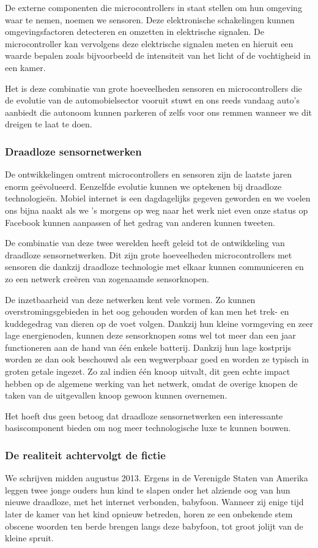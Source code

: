 \documentclass[DIV=calc,paper=a4,fontsize=11pt,twocolumn]{scrartcl}
\newcommand{\heading}[1]{
\vspace{-5mm}
\subsubsection*{#1}
\vspace{-2mm}
}
\begin{document}
De externe componenten die microcontrollers in staat stellen om hun omgeving
waar te nemen, noemen we sensoren. Deze elektronische schakelingen kunnen
omgevingsfactoren detecteren en omzetten in elektrische signalen. De
microcontroller kan vervolgens deze elektrische signalen meten en hieruit een
waarde bepalen zoals bijvoorbeeld de intensiteit van het licht of de
vochtigheid in een kamer.

Het is deze combinatie van grote hoeveelheden sensoren en microcontrollers die
de evolutie van de automobielsector vooruit stuwt en ons reeds vandaag auto's
aanbiedt die autonoom kunnen parkeren of zelfs voor ons remmen wanneer we dit
dreigen te laat te doen.

\heading{Draadloze sensornetwerken}

De ontwikkelingen omtrent microcontrollers en sensoren zijn de laatste jaren
enorm ge\"evolueerd. Eenzelfde evolutie kunnen we optekenen bij draadloze
technologie\"en. Mobiel internet is een dagdagelijks gegeven geworden en we
voelen ons bijna naakt als we 's morgens op weg naar het werk niet even onze
status op Facebook kunnen aanpassen of het gedrag van anderen kunnen tweeten.

De combinatie van deze twee werelden heeft geleid tot de ontwikkeling van
draadloze sensornetwerken. Dit zijn grote hoeveelheden microcontrollers met
sensoren die dankzij draadloze technologie met elkaar kunnen communiceren en zo
een netwerk cre\"eren van zogenaamde sensorknopen.

De inzetbaarheid van deze netwerken kent vele vormen. Zo kunnen
overstromingsgebieden in het oog gehouden worden of kan men het trek- en
kuddegedrag van dieren op de voet volgen. Dankzij hun kleine vormgeving en zeer
lage energienoden, kunnen deze sensorknopen soms wel tot meer dan een jaar
functioneren aan de hand van \'e\'en enkele batterij. Dankzij hun lage
kostprijs worden ze dan ook beschouwd als een wegwerpbaar goed en worden ze
typisch in groten getale ingezet. Zo zal indien \'e\'en knoop uitvalt, dit geen
echte impact hebben op de algemene werking van het netwerk, omdat de overige
knopen de taken van de uitgevallen knoop gewoon kunnen overnemen.

Het hoeft dus geen betoog dat draadloze sensornetwerken een interessante
basiscomponent bieden om nog meer technologische luxe te kunnen bouwen.

\heading{De realiteit achtervolgt de fictie}

We schrijven midden augustus 2013. Ergens in de Verenigde Staten van Amerika
leggen twee jonge ouders hun kind te slapen onder het alziende oog van hun
nieuwe draadloze, met het internet verbonden, babyfoon. Wanneer zij enige tijd
later de kamer van het kind opnieuw betreden, horen ze een onbekende stem
obscene woorden ten berde brengen langs deze babyfoon, tot groot jolijt van de
kleine spruit.
\end{document}
